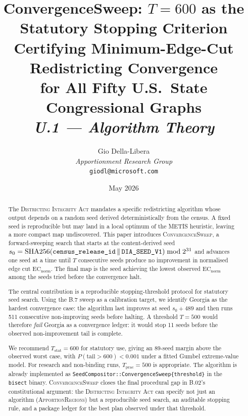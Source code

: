 \documentclass[12pt]{article}
\title{%
  \textbf{ConvergenceSweep: $T = 600$ as the Statutory Stopping Criterion}\\[0.4em]
  \large Certifying Minimum-Edge-Cut Redistricting Convergence\\
  for All Fifty U.S.\ State Congressional Graphs\\[0.8em]
  \normalsize\textit{U.1 --- Algorithm Theory}%
}
\author{%
  Gio Della-Libera\\
  \textit{Apportionment Research Group}\\
  \small\texttt{giodl@microsoft.com}
}
\date{May 2026}
\newcommand{\cs}{\textsc{ConvergenceSweep}}
\newcommand{\ar}{\textsc{ApportionRegions}}
\newcommand{\dia}{\textsc{Districting Integrity Act}}
\newcommand{\Tstat}{T_{\mathrm{stat}}}
\newcommand{\Tprac}{T_{\mathrm{prac}}}
\newcommand{\ECnorm}{\mathrm{EC}_{\mathrm{norm}}}
\newcommand{\seedexpr}{\operatorname{SHA256}\!\left(\text{\ttfamily census\_release\_id}\,\|\,\text{\ttfamily DIA\_SEED\_V1}\right)}
\begin{document}
\maketitle

\begin{abstract}
\noindent
The \dia{} mandates a specific redistricting algorithm whose output depends on
a random seed derived deterministically from the census.
A fixed seed is reproducible but may land in a local optimum of the METIS
heuristic, leaving a more compact map undiscovered.
This paper introduces \cs{}, a forward-sweeping search that starts at the
content-derived seed $s_0 = \seedexpr \bmod 2^{31}$ and advances one seed at a time until
$T$ consecutive seeds produce no improvement in normalised edge cut
$\ECnorm$.
The final map is the seed achieving the lowest observed $\ECnorm$ among the
seeds tried before the convergence halt.

The central contribution is a reproducible stopping-threshold protocol for
statutory seed search.
Using the B.7 sweep as a calibration target, we identify Georgia as the hardest
convergence case: the algorithm last improves at seed $s_0 + 489$ and then runs
511 consecutive non-improving seeds before halting.
A threshold $T = 500$ would therefore \emph{fail} Georgia as a convergence
ledger: it would stop 11 seeds before the observed non-improvement tail is
complete.

We recommend $\Tstat = 600$ for statutory use, giving an 89-seed margin above
the observed worst case, with $P(\text{tail} > 600) < 0.001$ under a fitted
Gumbel extreme-value model.
For research and non-binding runs, $\Tprac = 500$ is appropriate.
The algorithm is already implemented as
\texttt{SeedCompositor::ConvergenceSweep\{threshold\}} in the \texttt{bisect}
binary.
\cs{} closes the final procedural gap in B.02's constitutional argument: the
\dia{} can specify not just an algorithm (\ar{}) but a reproducible seed
search, an auditable stopping rule, and a package ledger for the best plan
observed under that threshold.
\end{abstract}

\tableofcontents
\newpage











\end{document}
